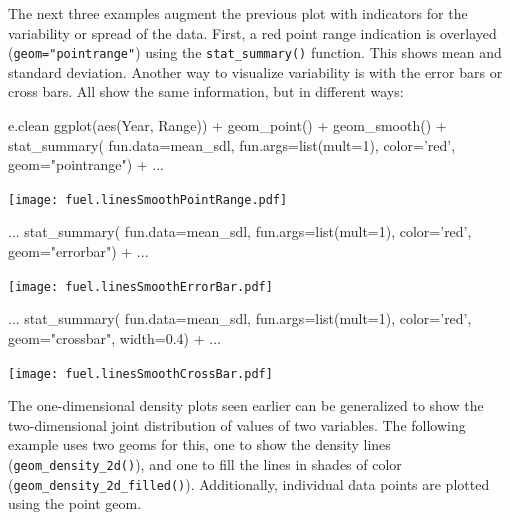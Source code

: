 The next three examples augment the previous plot with indicators for the variability or spread of the data. First, a red point range indication is overlayed (\texttt{geom="pointrange"}) using the \texttt{stat\_summary()} function. This shows mean and standard deviation. Another way to visualize variability is with the error bars or cross bars. All show the same information, but in different ways: 

\begin{samepage}
\begin{Rcode}
e.clean %
  ggplot(aes(Year, Range)) +
    geom_point() +
    geom_smooth() +
    stat_summary(
       fun.data=mean_sdl, 
       fun.args=list(mult=1), 
       color='red', 
       geom="pointrange") +
...
\end{Rcode}
\end{samepage}

\begin{center}
  \texttt{[image: fuel.linesSmoothPointRange.pdf]}
\end{center}


\begin{samepage}
\begin{Rcode}
...
    stat_summary(
        fun.data=mean_sdl, 
        fun.args=list(mult=1), 
        color='red', 
        geom="errorbar") +
...
\end{Rcode}
\end{samepage}

\begin{center}
  \texttt{[image: fuel.linesSmoothErrorBar.pdf]}
\end{center}

\begin{samepage}
\begin{Rcode}
...
    stat_summary(
        fun.data=mean_sdl, 
        fun.args=list(mult=1), 
        color='red', 
        geom="crossbar",
        width=0.4) +
...
\end{Rcode}
\end{samepage}

\begin{center}
  \texttt{[image: fuel.linesSmoothCrossBar.pdf]}
\end{center}

The one-dimensional density plots seen earlier can be generalized to show the two-dimensional joint distribution of values of two variables. The following example uses two geoms for this, one to show the density lines (\texttt{geom\_density\_2d()}), and one to fill the lines in shades of color (\texttt{geom\_density\_2d\_filled()}). Additionally, individual data points are plotted using the point geom. 

